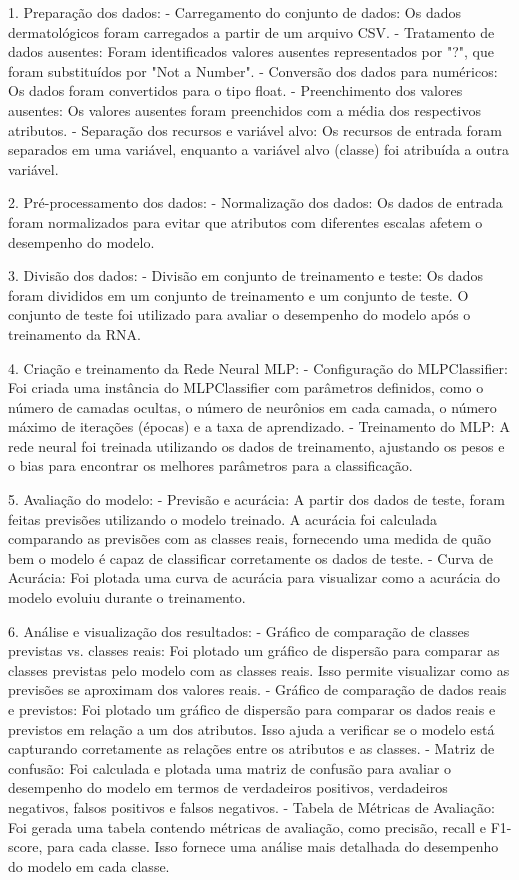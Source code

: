 \documentclass[conference]{IEEEtran}
\begin{document}
1. Preparação dos dados:
   - Carregamento do conjunto de dados: Os dados dermatológicos foram carregados a partir de um arquivo CSV.
   - Tratamento de dados ausentes: Foram identificados valores ausentes representados por "?", que foram substituídos por "Not a Number".
   - Conversão dos dados para numéricos: Os dados foram convertidos para o tipo float.
   - Preenchimento dos valores ausentes: Os valores ausentes foram preenchidos com a média dos respectivos atributos.
   - Separação dos recursos e variável alvo: Os recursos de entrada foram separados em uma variável, enquanto a variável alvo (classe) foi atribuída a outra variável.

2. Pré-processamento dos dados:
   - Normalização dos dados: Os dados de entrada foram normalizados para evitar que atributos com diferentes escalas afetem o desempenho do modelo.

3. Divisão dos dados:
   - Divisão em conjunto de treinamento e teste: Os dados foram divididos em um conjunto de treinamento e um conjunto de teste. O conjunto de teste foi utilizado para avaliar o desempenho do modelo após o treinamento da RNA.

4. Criação e treinamento da Rede Neural MLP:
   - Configuração do MLPClassifier: Foi criada uma instância do MLPClassifier com parâmetros definidos, como o número de camadas ocultas, o número de neurônios em cada camada, o número máximo de iterações (épocas) e a taxa de aprendizado.
   - Treinamento do MLP: A rede neural foi treinada utilizando os dados de treinamento, ajustando os pesos e o bias para encontrar os melhores parâmetros para a classificação.

5. Avaliação do modelo:
   - Previsão e acurácia: A partir dos dados de teste, foram feitas previsões utilizando o modelo treinado. A acurácia foi calculada comparando as previsões com as classes reais, fornecendo uma medida de quão bem o modelo é capaz de classificar corretamente os dados de teste.
   - Curva de Acurácia: Foi plotada uma curva de acurácia para visualizar como a acurácia do modelo evoluiu durante o treinamento.

6. Análise e visualização dos resultados:
   - Gráfico de comparação de classes previstas vs. classes reais: Foi plotado um gráfico de dispersão para comparar as classes previstas pelo modelo com as classes reais. Isso permite visualizar como as previsões se aproximam dos valores reais.
   - Gráfico de comparação de dados reais e previstos: Foi plotado um gráfico de dispersão para comparar os dados reais e previstos em relação a um dos atributos. Isso ajuda a verificar se o modelo está capturando corretamente as relações entre os atributos e as classes.
   - Matriz de confusão: Foi calculada e plotada uma matriz de confusão para avaliar o desempenho do modelo em termos de verdadeiros positivos, verdadeiros negativos, falsos positivos e falsos negativos.
   - Tabela de Métricas de Avaliação: Foi gerada uma tabela contendo métricas de avaliação, como precisão, recall e F1-score, para cada classe. Isso fornece uma análise mais detalhada do desempenho do modelo em cada classe.
\end{document}
